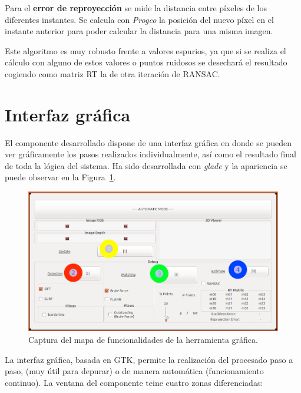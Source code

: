 Para el \textbf{error de reproyección} se mide la distancia entre píxeles de los diferentes instantes. Se calcula con \textit{Progeo} la posición del nuevo píxel en el instante anterior para poder calcular la distancia para una misma imagen.

Este algoritmo es muy robusto frente a valores espurios, ya que si se realiza el cálculo con alguno de estos valores o puntos ruidosos se desechará el resultado cogiendo como matriz RT la de otra iteración de RANSAC.

\section{Interfaz gráfica}

El componente desarrollado dispone de una interfaz gráfica en donde se pueden ver gráficamente los pasos realizados individualmente, así como el resultado final de toda la lógica del sistema. Ha sido desarrollada con \textit{glade} y la apariencia se puede observar en la Figura~\ref{fig:supergui}.

\begin{figure}[th]
\centering
\includegraphics[scale=0.4]{Figures/super_gui.png}
\decoRule
\caption[Captura del mapa de funcionalidades de la herramienta gráfica]{Captura del mapa de funcionalidades de la herramienta gráfica.}
\label{fig:supergui}
\end{figure}

La interfaz gráfica, basada en GTK, permite la realización  del procesado paso a paso, (muy útil para depurar) o de manera automática (funcionamiento continuo). La ventana del componente teine cuatro zonas diferenciadas: 

